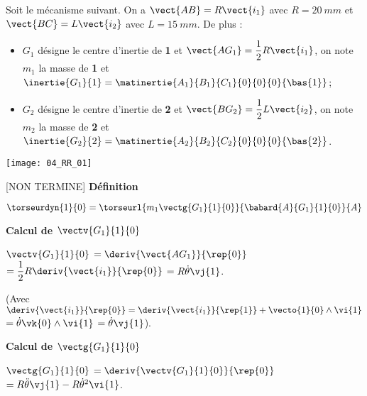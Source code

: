 \normaltrue
\correctionfalse


\setcounter{question}{0}%
\ifcorrection
\else
{}
\fi

\ifprof
\else
Soit le mécanisme suivant. On a $\vect{AB}=R\vect{i_1}$ avec $R=\SI{20}{mm}$ et  
$\vect{BC}=L\vect{i_2}$ avec $L=\SI{15}{mm}$. De plus :
\begin{itemize}
\item $G_1$ désigne le centre d'inertie de \textbf{1} et $\vect{AG_1}=\dfrac{1}{2}R\vect{i_1}$, on note $m_1$ la masse de \textbf{1} et $\inertie{G_1}{1}=\matinertie{A_1}{B_1}{C_1}{0}{0}{0}{\bas{1}}$; 
\item $G_2$ désigne le centre d'inertie de \textbf{2} et $\vect{BG_2}=\dfrac{1}{2}L\vect{i_2}$, on note $m_2$ la masse de \textbf{2} et $\inertie{G_2}{2}=\matinertie{A_2}{B_2}{C_2}{0}{0}{0}{\bas{2}}$.
\end{itemize}
\begin{marginfigure}
\texttt{[image: 04\_RR\_01]}
\end{marginfigure}
\fi

\ifprof

[NON TERMINE]
\textbf{Définition}

$\torseurdyn{1}{0} = \torseurl{m_1 \vectg{G_1}{1}{0}}{\babard{A}{G_1}{1}{0}}{A}$

\textbf{Calcul de $\vectv{G_1}{1}{0}$}

$\vectv{G_1}{1}{0}$ $ = \deriv{\vect{AG_1}}{\rep{0}}$
$ = \dfrac{1}{2}R\deriv{\vect{i_1}}{\rep{0}}$
$ = R\dot{\theta}\vj{1}$.

(Avec $\deriv{\vect{i_1}}{\rep{0}} = \deriv{\vect{i_1}}{\rep{1}} + \vecto{1}{0}\wedge \vi{1}$
$ = \dot{\theta}\vk{0}\wedge \vi{1}$ $ = \dot{\theta}\vj{1}$).

\textbf{Calcul de $\vectg{G_1}{1}{0}$}

$\vectg{G_1}{1}{0}$ $ = \deriv{{\vectv{G_1}{1}{0}}}{\rep{0}}$
$ =  R\ddot{\theta}\vj{1} - R\dot{\theta}^2\vi{1} $.

